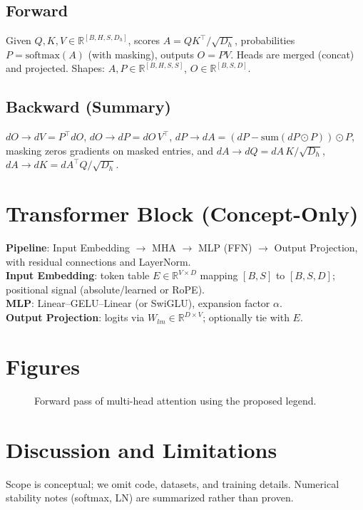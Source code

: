 \documentclass[10pt]{article}
\begin{document}
\subsection{Forward}
Given $Q,K,V\in\mathbb{R}^{[B,H,S,D_h]}$, scores $A=QK^{\top}/\sqrt{D_h}$, probabilities $P=\text{softmax}(A)$ (with masking), outputs $O=PV$. Heads are merged (concat) and projected. Shapes: $A,P\in\mathbb{R}^{[B,H,S,S]}$, $O\in\mathbb{R}^{[B,S,D]}$.

\subsection{Backward (Summary)}
$dO\rightarrow dV=P^{\top}dO$, $dO\rightarrow dP=dO\,V^{\top}$, $dP\rightarrow dA=(dP-\text{sum}(dP\odot P))\odot P$, masking zeros gradients on masked entries, and $dA\rightarrow dQ=dA\,K/\sqrt{D_h}$, $dA\rightarrow dK=dA^{\top}Q/\sqrt{D_h}$.

\section{Transformer Block (Concept-Only)}
\textbf{Pipeline}: Input Embedding $\rightarrow$ MHA $\rightarrow$ MLP (FFN) $\rightarrow$ Output Projection, with residual connections and LayerNorm.\\
\textbf{Input Embedding}: token table $E\in\mathbb{R}^{V\times D}$ mapping $[B,S]$ to $[B,S,D]$; positional signal (absolute/learned or RoPE).\\
\textbf{MLP}: Linear--GELU--Linear (or SwiGLU), expansion factor $\alpha$.\\
\textbf{Output Projection}: logits via $W_{lm}\in\mathbb{R}^{D\times V}$; optionally tie with $E$.

\section{Figures}
\begin{figure}[h]
  \centering
  \caption{Forward pass of multi-head attention using the proposed legend.}
  \label{fig:mha-forward}
\end{figure}

\section{Discussion and Limitations}
Scope is conceptual; we omit code, datasets, and training details. Numerical stability notes (softmax, LN) are summarized rather than proven.
\end{document}
